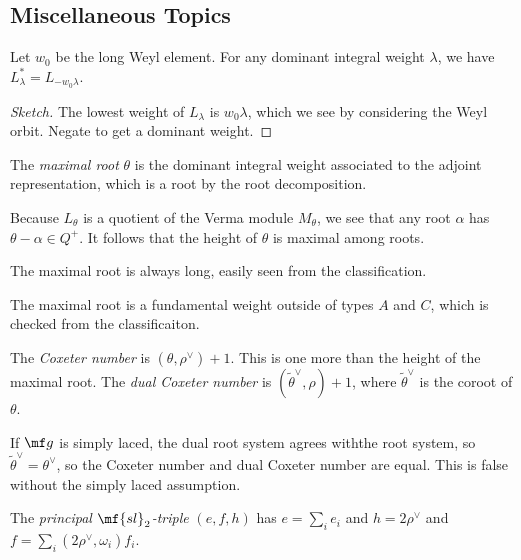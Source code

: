 \documentclass{article}
\begin{document}
\subsection{Miscellaneous Topics}
\begin{proposition}
	Let $w_0$ be the long Weyl element. For any dominant integral weight $\lambda$, we have $L_\lambda^*=L_{-w_0\lambda}$.
\end{proposition}
\begin{proof}[Sketch]
	The lowest weight of $L_\lambda$ is $w_0\lambda$, which we see by considering the Weyl orbit. Negate to get a dominant weight.
\end{proof}
\begin{definition}
	The \textit{maximal root} $\theta$ is the dominant integral weight associated to the adjoint representation, which is a root by the root decomposition.
\end{definition}
\begin{remark}
	Because $L_\theta$ is a quotient of the Verma module $M_\theta$, we see that any root $\alpha$ has $\theta-\alpha\in Q^+$. It follows that the height of $\theta$ is maximal among roots.
\end{remark}
\begin{remark}
	The maximal root is always long, easily seen from the classification.
\end{remark}
\begin{remark}
	The maximal root is a fundamental weight outside of types $A$ and $C$, which is checked from the classificaiton.
\end{remark}
\begin{definition}
	The \textit{Coxeter number} is $(\theta,\rho^\lor)+1$. This is one more than the height of the maximal root. The \textit{dual Coxeter number} is $(\widetilde\theta^\lor,\rho)+1$, where $\widetilde\theta^\lor$ is the coroot of $\theta$.
\end{definition}
\begin{remark}
	If $\mf g$ is simply laced, the dual root system agrees withthe root system, so $\widetilde\theta^\lor=\theta^\lor$, so the Coxeter number and dual Coxeter number are equal. This is false without the simply laced assumption.
\end{remark}
\begin{definition}
	The \textit{principal $\mf{sl}_2$-triple} $(e,f,h)$ has $e=\sum_ie_i$ and $h=2\rho^\lor$ and $f=\sum_i(2\rho^\lor,\omega_i)f_i$.
\end{definition}
\end{document}
